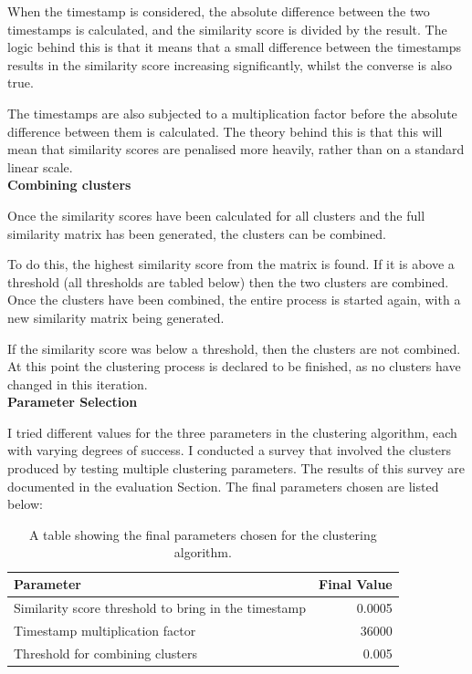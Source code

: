 \documentclass[12pt]{article}
\begin{document}
When the timestamp is considered, the absolute difference between the two timestamps is calculated, and the similarity score is divided by the result. The logic behind this is that it means that a small difference between the timestamps results in the similarity score increasing significantly, whilst the converse is also true.

The timestamps are also subjected to a multiplication factor before the absolute difference between them is calculated. The theory behind this is that this will mean that similarity scores are penalised more heavily, rather than on a standard linear scale. \\

\textbf{Combining clusters}

Once the similarity scores have been calculated for all clusters and the full similarity matrix has been generated, the clusters can be combined.

To do this, the highest similarity score from the matrix is found. If it is above a threshold (all thresholds are tabled below) then the two clusters are combined. Once the clusters have been combined, the entire process is started again, with a new similarity matrix being generated.

If the similarity score was below a threshold, then the clusters are not combined. At this point the clustering process is declared to be finished, as no clusters have changed in this iteration. \\

\textbf{Parameter Selection}

I tried different values for the three parameters in the clustering algorithm, each with varying degrees of success. I conducted a survey that involved the clusters produced by testing multiple clustering parameters. The results of this survey are documented in the evaluation Section. The final parameters chosen are listed below:

\begin{table}[H]
	\centering
	\begin{tabular}{l|r}
		\textbf{Parameter} & \textbf{Final Value} \\ \hline
		Similarity score threshold to bring in the timestamp & 0.0005 \\ \hline
		Timestamp multiplication factor & 36000 \\ \hline
		Threshold for combining clusters &  0.005 \\ \hline
	\end{tabular}
	\caption[Parameters for the clustering algorithn]{A table showing the final parameters chosen for the clustering algorithm.}
	\label{clusteringparameters}
\end{table}
\end{document}
